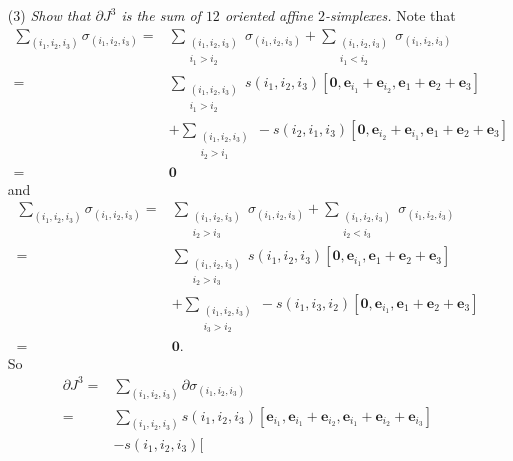 \documentclass{article}
\begin{document}
\begin{enumerate}
\item[(3)]
  \emph{Show that $\partial J^3$ is the sum of $12$ oriented affine $2$-simplexes.}
  Note that
  \begin{align*}
    \sum_{(i_1,i_2,i_3)} \sigma_{(i_1, i_2, i_3)}
    =&
    \sum_{\substack{(i_1,i_2,i_3) \\ i_1 > i_2}} \sigma_{(i_1, i_2, i_3)}
      + \sum_{\substack{(i_1,i_2,i_3) \\ i_1 < i_2}} \sigma_{(i_1, i_2, i_3)} \\
    =&
    \sum_{\substack{(i_1,i_2,i_3) \\ i_1 > i_2}} s(i_1, i_2, i_3)
    [
      \mathbf{0},
      \mathbf{e}_{i_1}+\mathbf{e}_{i_2},
      \mathbf{e}_{1}+\mathbf{e}_{2}+\mathbf{e}_{3}
    ] \\
    &+ \sum_{\substack{(i_1,i_2,i_3) \\ i_2 > i_1}} -s(i_2, i_1, i_3)
      [
        \mathbf{0},
        \mathbf{e}_{i_2}+\mathbf{e}_{i_1},
        \mathbf{e}_{1}+\mathbf{e}_{2}+\mathbf{e}_{3}
      ] \\
    =& \mathbf{0}
  \end{align*}
  and
  \begin{align*}
    \sum_{(i_1,i_2,i_3)} \sigma_{(i_1, i_2, i_3)}
    =&
    \sum_{\substack{(i_1,i_2,i_3) \\ i_2 > i_3}} \sigma_{(i_1, i_2, i_3)}
      + \sum_{\substack{(i_1,i_2,i_3) \\ i_2 < i_3}} \sigma_{(i_1, i_2, i_3)} \\
    =&
    \sum_{\substack{(i_1,i_2,i_3) \\ i_2 > i_3}} s(i_1, i_2, i_3)
    [
      \mathbf{0},
      \mathbf{e}_{i_1},
      \mathbf{e}_{1}+\mathbf{e}_{2}+\mathbf{e}_{3}
    ] \\
    &+ \sum_{\substack{(i_1,i_2,i_3) \\ i_3 > i_2}} -s(i_1, i_3, i_2)
      [
        \mathbf{0},
        \mathbf{e}_{i_1},
        \mathbf{e}_{1}+\mathbf{e}_{2}+\mathbf{e}_{3}
      ] \\
    =&
    \mathbf{0}.
  \end{align*}
  So
  \begin{align*}
    \partial J^3
    =& \sum_{(i_1,i_2,i_3)} \partial \sigma_{(i_1, i_2, i_3)} \\
    =& \sum_{(i_1,i_2,i_3)} s(i_1, i_2, i_3)
      [
        \mathbf{e}_{i_1},
        \mathbf{e}_{i_1}+\mathbf{e}_{i_2},
        \mathbf{e}_{i_1}+\mathbf{e}_{i_2}+\mathbf{e}_{i_3}
      ] \\
      &- s(i_1, i_2, i_3)[

\end{align*}
\end{enumerate}
\end{document}
